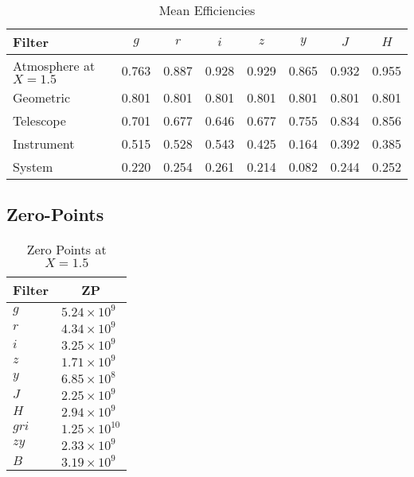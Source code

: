 \documentclass{article}
\begin{document}
\begin{table}
\caption{Mean Efficiencies}
\label{table:mean-efficiencies}
\medskip
\begin{center}
\small
\begin{tabular}{lccccccc}
\hline
\hline
Filter&$g$&$r$&$i$&$z$&$y$&$J$&$H$\\
\hline
Atmosphere at $X=1.5$&0.763&0.887&0.928&0.929&0.865&0.932&0.955\\
Geometric            &0.801&0.801&0.801&0.801&0.801&0.801&0.801\\
Telescope            &0.701&0.677&0.646&0.677&0.755&0.834&0.856\\
Instrument           &0.515&0.528&0.543&0.425&0.164&0.392&0.385\\
\hline
System               &0.220&0.254&0.261&0.214&0.082&0.244&0.252\\
\hline
\end{tabular}
\end{center}
\end{table}

\subsection{Zero-Points}

\begin{table}
\caption{Zero Points at $X = 1.5$}
\label{table:performance}
\medskip
\begin{center}
\small
\begin{tabular}{lc}
\hline
\hline
Filter&ZP\\
\hline
$g$  &$5.24 \times 10^{9\phantom{0}}$\\
$r$  &$4.34 \times 10^{9\phantom{0}}$\\
$i$  &$3.25 \times 10^{9\phantom{0}}$\\
$z$  &$1.71 \times 10^{9\phantom{0}}$\\
$y$  &$6.85 \times 10^{8\phantom{0}}$\\
$J$  &$2.25 \times 10^{9\phantom{0}}$\\
$H$  &$2.94 \times 10^{9\phantom{0}}$\\
$gri$&$1.25 \times 10^{10\phantom{}}$\\
$zy$ &$2.33 \times 10^{9\phantom{0}}$\\
$B$  &$3.19 \times 10^{9\phantom{0}}$\\
\hline
\end{tabular}
\end{center}
\end{table}
\end{document}
